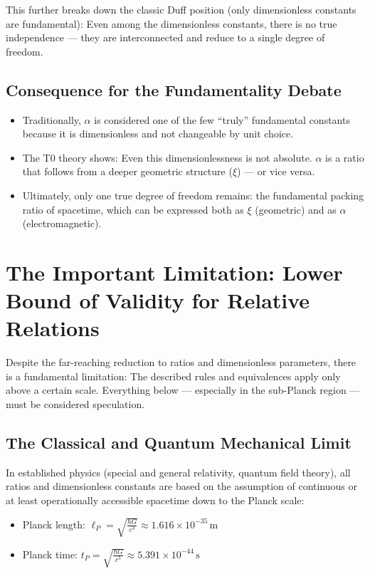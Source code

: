 	This further breaks down the classic Duff position (only dimensionless constants are fundamental): Even among the dimensionless constants, there is no true independence --- they are interconnected and reduce to a single degree of freedom.
	
	\subsection{Consequence for the Fundamentality Debate}
	\begin{itemize}
		\item Traditionally, $\alpha$ is considered one of the few ``truly'' fundamental constants because it is dimensionless and not changeable by unit choice.
		\item The T0 theory shows: Even this dimensionlessness is not absolute. $\alpha$ is a ratio that follows from a deeper geometric structure ($\xi$) --- or vice versa.
		\item Ultimately, only one true degree of freedom remains: the fundamental packing ratio of spacetime, which can be expressed both as $\xi$ (geometric) and as $\alpha$ (electromagnetic).
	\end{itemize}
	
	\section{The Important Limitation: Lower Bound of Validity for Relative Relations}
	Despite the far-reaching reduction to ratios and dimensionless parameters, there is a fundamental limitation: The described rules and equivalences apply only above a certain scale. Everything below --- especially in the sub-Planck region --- must be considered speculation.
	
	\subsection{The Classical and Quantum Mechanical Limit}
	In established physics (special and general relativity, quantum field theory), all ratios and dimensionless constants are based on the assumption of continuous or at least operationally accessible spacetime down to the Planck scale:
	\begin{itemize}
		\item Planck length: $\ell_P = \sqrt{\frac{\hbar G}{c^3}} \approx 1.616 \times 10^{-35}\,\text{m}$
		\item Planck time: $t_P = \sqrt{\frac{\hbar G}{c^5}} \approx 5.391 \times 10^{-44}\,\text{s}$
	\end{itemize}
	

